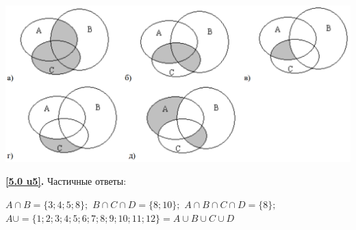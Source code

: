 \begin{minipage}[h]{0.9\linewidth}
\centering
    \includegraphics[scale=0.4]{./img/50_otveti}
\end{minipage}
\par
\textbf{\ref{5.0 u5}.} Частичные ответы: 
\par
$A \cap B = \{3; 4; 5; 8\};$ $B \cap C \cap D = \{8; 10\};$ $A \cap B \cap C \cap D = \{8\};$ $A \cup = \{1; 2; 3; 4; 5; 6; 7; 8; 9; 10; 11; 12\} = A \cup B \cup C \cup D$